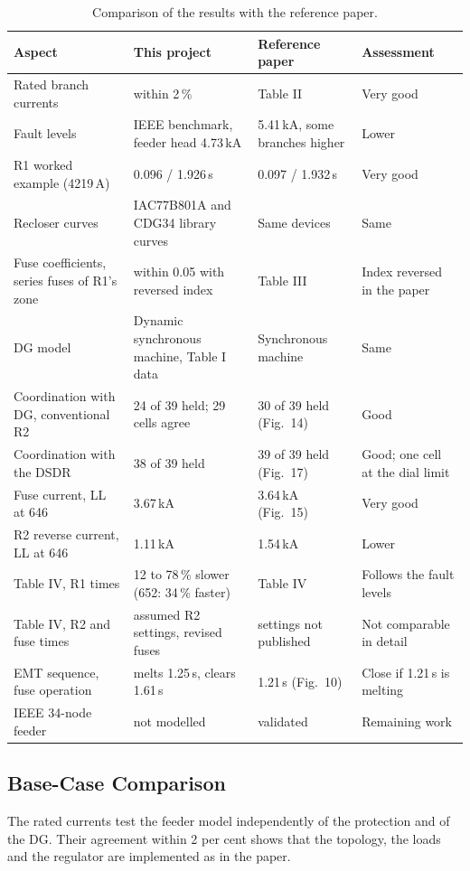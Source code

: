 \documentclass[12pt,a4paper]{article}
\begin{document}
\begin{table}[H]
\centering\footnotesize
\begin{tabularx}{\textwidth}{|L|L|L|l|}
\hline
\textbf{Aspect} & \textbf{This project} & \textbf{Reference paper} & \textbf{Assessment} \\ \hline
Rated branch currents & within 2\,\% & Table II & Very good \\ \hline
Fault levels & IEEE benchmark, feeder head 4.73\,kA & 5.41\,kA, some branches higher & Lower \\ \hline
R1 worked example (4219\,A) & 0.096 / 1.926\,s & 0.097 / 1.932\,s & Very good \\ \hline
Recloser curves & IAC77B801A and CDG34 library curves & Same devices & Same \\ \hline
Fuse coefficients, series fuses of R1's zone & within 0.05 with reversed index & Table III & Index reversed in the paper \\ \hline
DG model & Dynamic synchronous machine, Table I data & Synchronous machine & Same \\ \hline
Coordination with DG, conventional R2 & 24 of 39 held; 29 cells agree & 30 of 39 held (Fig.~14) & Good \\ \hline
Coordination with the DSDR & 38 of 39 held & 39 of 39 held (Fig.~17) & Good; one cell at the dial limit \\ \hline
Fuse current, LL at 646 & 3.67\,kA & 3.64\,kA (Fig.~15) & Very good \\ \hline
R2 reverse current, LL at 646 & 1.11\,kA & 1.54\,kA & Lower \\ \hline
Table IV, R1 times & 12 to 78\,\% slower (652: 34\,\% faster) & Table IV & Follows the fault levels \\ \hline
Table IV, R2 and fuse times & assumed R2 settings, revised fuses & settings not published & Not comparable in detail \\ \hline
EMT sequence, fuse operation & melts 1.25\,s, clears 1.61\,s & 1.21\,s (Fig.~10) & Close if 1.21\,s is melting \\ \hline
IEEE 34-node feeder & not modelled & validated & Remaining work \\ \hline
\end{tabularx}
\caption{Comparison of the results with the reference paper.}
\label{tab:compare}
\end{table}

\subsection*{Base-Case Comparison}
The rated currents test the feeder model independently of the protection and of the DG. Their agreement
within 2 per cent shows that the topology, the
loads and the regulator are implemented as in the paper.
\end{document}
